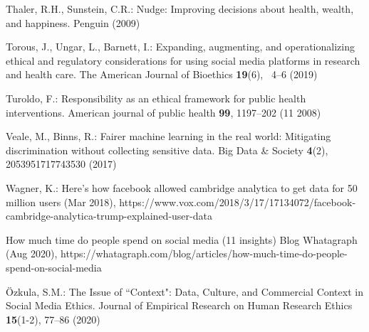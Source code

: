 \documentclass[11pt]{article} %
\begin{document}
\begin{thebibliography}{10}
\begin{small}
Thaler, R.H., Sunstein, C.R.: Nudge: Improving decisions about health, wealth,
  and happiness. Penguin (2009)

Torous, J., Ungar, L., Barnett, I.: Expanding, augmenting, and operationalizing
  ethical and regulatory considerations for using social media platforms in
  research and health care. The American Journal of Bioethics  \textbf{19}(6),
  ~4--6 (2019)

Turoldo, F.: Responsibility as an ethical framework for public health
  interventions. American journal of public health  \textbf{99},  1197--202 (11
  2008)

Veale, M., Binns, R.: Fairer machine learning in the real world: Mitigating
  discrimination without collecting sensitive data. Big Data \& Society
  \textbf{4}(2),  2053951717743530 (2017)

Wagner, K.: Here’s how facebook allowed cambridge analytica to get data for
  50 million users (Mar 2018),
  https://www.vox.com/2018/3/17/17134072/facebook-cambridge-analytica-trump-explained-user-data

How much time do people spend on social media (11 insights) {\textbar} {Blog}
  {\textbar} {Whatagraph} (Aug 2020),
  https://whatagraph.com/blog/articles/how-much-time-do-people-spend-on-social-media

Özkula, S.M.: The {Issue} of ``{Context}": {Data}, {Culture}, and
  {Commercial} {Context} in {Social} {Media} {Ethics}. Journal of Empirical
  Research on Human Research Ethics  \textbf{15}(1-2),  77--86 (2020)
\end{small}
\end{thebibliography}

%
% 
% 
\end{document}

